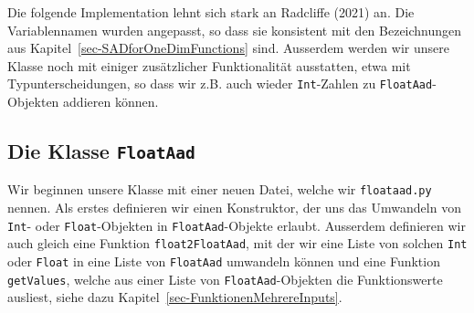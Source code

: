 \documentclass[
  a4paper,
  DIV=11]{scrreprt}
\theoremstyle{definition}
\theoremstyle{definition}
\theoremstyle{remark}
\begin{document}
Die folgende Implementation lehnt sich stark an Radcliffe (2021) an. Die
Variablennamen wurden angepasst, so dass sie konsistent mit den
Bezeichnungen aus Kapitel~\ref{sec-SADforOneDimFunctions} sind.
Ausserdem werden wir unsere Klasse noch mit einiger zusätzlicher
Funktionalität ausstatten, etwa mit Typunterscheidungen, so dass wir
z.B. auch wieder \texttt{Int}-Zahlen zu \texttt{FloatAad}-Objekten
addieren können.

\hypertarget{die-klasse-floataad}{%
\subsection{\texorpdfstring{Die Klasse
\texttt{FloatAad}}{Die Klasse FloatAad}}\label{die-klasse-floataad}}

Wir beginnen unsere Klasse mit einer neuen Datei, welche wir
\texttt{floataad.py} nennen. Als erstes definieren wir einen
Konstruktor, der uns das Umwandeln von \texttt{Int}- oder
\texttt{Float}-Objekten in \texttt{FloatAad}-Objekte erlaubt. Ausserdem
definieren wir auch gleich eine Funktion \texttt{float2FloatAad}, mit
der wir eine Liste von solchen \texttt{Int} oder \texttt{Float} in eine
Liste von \texttt{FloatAad} umwandeln können und eine Funktion
\texttt{getValues}, welche aus einer Liste von
\texttt{FloatAad}-Objekten die Funktionswerte ausliest, siehe dazu
Kapitel~\ref{sec-FunktionenMehrereInputs}.
\end{document}
